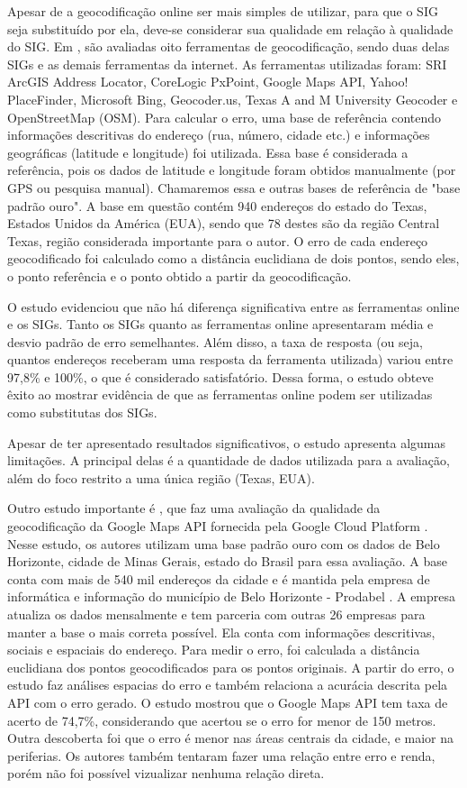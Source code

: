 Apesar de a geocodificação online ser mais simples de utilizar, para que o SIG seja substituído por ela, deve-se considerar sua qualidade em relação à qualidade do SIG. Em \cite{Chow2016}, são avaliadas oito ferramentas de geocodificação, sendo duas delas SIGs e as demais ferramentas da internet. As ferramentas utilizadas foram: SRI ArcGIS Address Locator, CoreLogic PxPoint, Google Maps API, Yahoo! PlaceFinder, Microsoft Bing, Geocoder.us, Texas A and M University Geocoder e OpenStreetMap (OSM). Para calcular o erro, uma base de referência contendo informações descritivas do endereço (rua, número, cidade etc.) e informações geográficas (latitude e longitude) foi utilizada. Essa base é considerada a referência, pois os dados de latitude e longitude foram obtidos manualmente (por GPS ou pesquisa manual). Chamaremos essa e outras bases de referência de "base padrão ouro". A base em questão contém 940 endereços do estado do Texas, Estados Unidos da América (EUA), sendo que 78 destes são da região Central Texas, região considerada importante para o autor. O erro de cada endereço geocodificado foi calculado como a distância euclidiana de dois pontos, sendo eles, o ponto referência e o ponto obtido a partir da geocodificação.

O estudo evidenciou que não há diferença significativa entre as ferramentas online e os SIGs. Tanto os SIGs quanto as ferramentas online apresentaram média e desvio padrão de erro semelhantes. Além disso, a taxa de resposta (ou seja, quantos endereços receberam uma resposta da ferramenta utilizada) variou entre 97,8\% e 100\%, o que é considerado satisfatório. Dessa forma, o estudo obteve êxito ao mostrar evidência de que as ferramentas online podem ser utilizadas como substitutas dos SIGs.

Apesar de \cite{Chow2016} ter apresentado resultados significativos, o estudo apresenta algumas limitações. A principal delas é a quantidade de dados utilizada para a avaliação, além do foco restrito a uma única região (Texas, EUA). 

Outro estudo importante é \cite{Clodoveu2011}, que faz uma avaliação da qualidade da geocodificação da Google Maps API fornecida pela Google Cloud Platform \cite{GCP}. Nesse estudo, os autores utilizam uma base padrão ouro com os dados de Belo Horizonte, cidade de Minas Gerais, estado do Brasil para essa avaliação. A base conta com mais de 540 mil endereços da cidade e é mantida pela empresa de informática e informação do município de Belo Horizonte - Prodabel \cite{Prodabel}. A empresa atualiza os dados mensalmente e tem parceria com outras 26 empresas para manter a base o mais correta possível. Ela conta com informações descritivas, sociais e espaciais do endereço. Para medir o erro, foi calculada a distância euclidiana dos pontos geocodificados para os pontos originais. A partir do erro, o estudo faz análises espacias do erro e também relaciona a acurácia descrita pela API com o erro gerado. O estudo mostrou que o Google Maps API tem taxa de acerto de 74,7\%, considerando que acertou se o erro for menor de 150 metros. Outra descoberta foi que o erro é menor nas áreas centrais da cidade, e maior na periferias. Os autores também tentaram fazer uma relação entre erro e renda, porém não foi possível vizualizar nenhuma relação direta.

